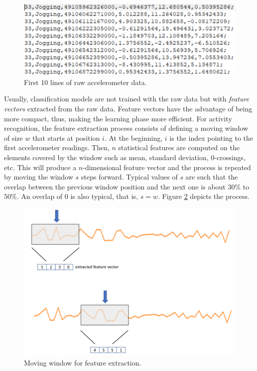 \documentclass[
  11pt,
]{krantz}
\begin{document}
\begin{figure}

{\centering \includegraphics[width=0.6\linewidth]{images/wisdmFirstLines} 

}

\caption{First 10 lines of raw accelerometer data.}\label{fig:wisdmFirstLines}
\end{figure}

Usually, classification models are not trained with the raw data but with \emph{feature vectors} extracted from the raw data. Feature vectors have the advantage of being more compact, thus, making the learning phase more efficient. For activity recognition, the feature extraction process consists of defining a moving window of size \(w\) that starts at position \(i\). At the beginning, \(i\) is the index pointing to the first accelerometer readings. Then, \(n\) statistical features are computed on the elements covered by the window such as mean, standard deviation, \(0\)-crossings, etc. This will produce a \(n\)-dimensional feature vector and the process is repeated by moving the window \(s\) steps forward. Typical values of \(s\) are such that the overlap between the previous window position and the next one is about \(30\%\) to \(50\%\). An overlap of \(0\) is also typical, that is, \(s = w\). Figure \ref{fig:featureExtraction} depicts the process.

\begin{figure}

{\centering \includegraphics[width=0.7\linewidth]{images/featureExtraction} 

}

\caption{Moving window for feature extraction.}\label{fig:featureExtraction}
\end{figure}
\end{document}
